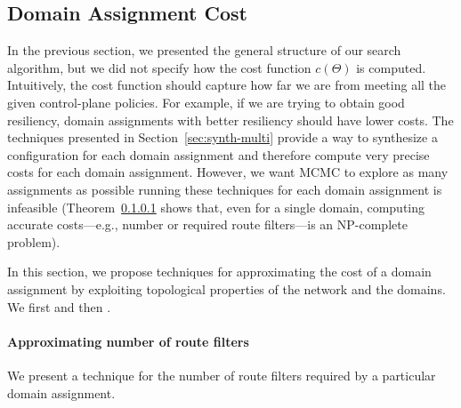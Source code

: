 \subsection{Domain Assignment Cost}
In the previous section, we presented the general structure of our search algorithm,
but we did not specify how the cost function $c(\Theta)$
is computed. Intuitively, the cost function should capture
how far we are from meeting all the given control-plane policies.
For example, if we are trying to obtain good resiliency,
domain assignments with better resiliency should have lower costs.
The techniques presented in Section~\ref{sec:synth-multi} provide a way to 
synthesize a configuration for each domain assignment and therefore compute
very precise costs for each domain assignment. However, 
we want MCMC to explore as many assignments as possible
running these techniques for
each domain assignment is infeasible (Theorem~\ref{} shows that, even for a single domain, computing accurate costs---e.g., number or
required route filters---is an NP-complete
problem).


In this section, we propose techniques for approximating the cost of a domain assignment 
by exploiting topological properties of the network and the domains.
We first 
and then .





\paragraph{Approximating number of route filters}
We present a technique for  the number of route 
filters required by a particular domain assignment.

